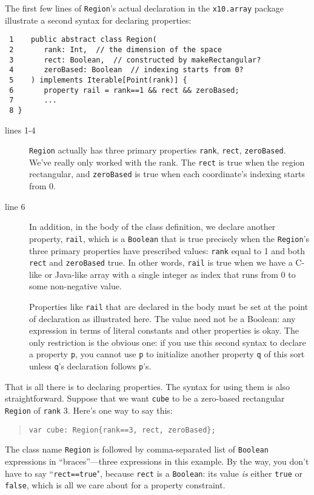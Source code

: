 The first few lines of {\tt Region}'s actual declaration in the {\tt x10.array}
package illustrate a second syntax for declaring properties:
\begin{verbatim}
 1    public abstract class Region(
 2       rank: Int,  // the dimension of the space 
 3       rect: Boolean,  // constructed by makeRectangular?
 4       zeroBased: Boolean  // indexing starts from 0?
 5    ) implements Iterable[Point(rank)] {
 6       property rail = rank==1 && rect && zeroBased;
 7       ...
 8 }
\end{verbatim}
\begin{description}
\item[lines 1-4]  {\tt Region} actually has three primary properties
 {\tt rank}, {\tt rect}, {\tt zeroBased}.   We've really only worked with the
 rank.  The {\tt rect} is true when the region rectangular, and {\tt zeroBased}
 is true when each coordinate's indexing starts from 0.
\item[line 6] In addition, in the body of the class definition, we declare another
property, {\tt rail}, which is a {\tt Boolean} that is true precisely when the
{\tt  Region}'s three primary properties have prescribed values:  {\tt rank}
equal to 1  and both {\tt rect} and {\tt zeroBased} true.  In other words,
{\tt rail} is true when we have a C-like or Java-like array with a single integer
as index that runs from 0 to some non-negative value.

Properties like {\tt rail} that are declared in the body must be set
at the point of declaration as illustrated here.  The value need not be a 
Boolean: any expression in terms of literal constants and other properties
is okay.  The only restriction is the obvious one: if you use this second
syntax to declare a property {\tt p}, you cannot use {\tt p} to initialize
another property {\tt q} of this sort unless {\tt q}'s declaration follows {\tt p}'s.
\end{description}

That is all there is to declaring properties.  The syntax for using them is
also straightforward. 
Suppose that we want {\tt cube} to be a zero-based rectangular {\tt Region}
of {\tt rank} 3.  Here's one way to say this:
\begin{quote}
{\tt var cube: Region\{rank==3, rect, zeroBased\};}
\end{quote}
The class name {\tt Region} is followed by comma-separated list of
{\tt Boolean} expressions in ``braces''---three expressions in this example.
By the way, you don't have to say ``{\tt rect==true}",
because {\tt rect} is a {\tt Boolean}: its value {\em is} either {\tt true}
or {\tt false}, which is all we care about for a property constraint.

